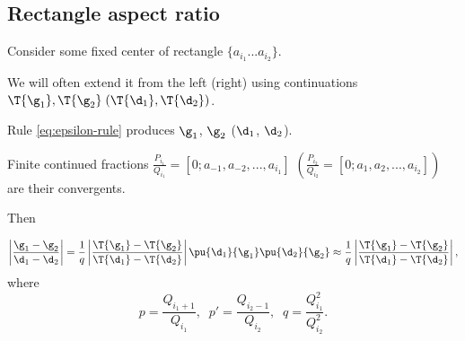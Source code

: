\subsection{Rectangle aspect ratio}

Consider some fixed center of rectangle $\{a_{i_1} ... a_{i_2}\}$.

We will often extend it from the left (right) using continuations
$\T{\g_1}, \T{\g_2}\; (\T{\d_1}, \T{\d_2})$.

Rule \ref{eq:epsilon-rule} produces $\g_1$, $\g_2$ ($\d_1$, $\d_2$).

Finite continued fractions
$\frac{P_{i_1}}{Q_{i_1}} = [0; a_{-1}, a_{-2}, ..., a_{i_1}]$
$\left(\frac{P_{i_2}}{Q_{i_2}} = [0; a_{1}, a_{2}, ..., a_{i_2}]\right)$
are their convergents.

Then

\begin{equation}\label{eq:aspect-ratio}
	\left| \dfrac{\g_1 - \g_2}{\d_1 - \d_2} \right|
	=
	\dfrac{1}{q}
	\left| \dfrac{\T{\g_1} - \T{\g_2}}
	{\T{\d_1} - \T{\d_2}} \right|
	\pu{\d_1}{\g_1}
	\pu{\d_2}{\g_2}
	\approx
	\dfrac{1}{q}
	\left| \dfrac{\T{\g_1} - \T{\g_2}}
	{\T{\d_1} - \T{\d_2}} \right|,
\end{equation}
where
\begin{equation*}
	p = \dfrac{Q_{i_1 + 1}}{Q_{i_1}},\;\;
	p' = \dfrac{Q_{i_2 - 1}}{Q_{i_2}},\;\;
	q = \dfrac{Q_{i_1}^2}{Q_{i_2}^2}.
\end{equation*}
